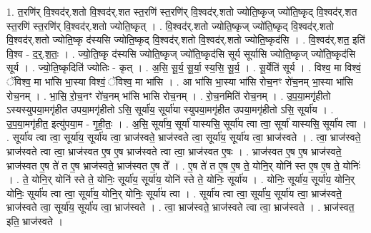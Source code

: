 \documentclass[17pt]{extarticle}
\begin{document}
1. त॒रणि॑र् वि॒श्वद॑र्.शतो वि॒श्वद॑र्.शत स्त॒रणि॑ स्त॒रणि॑र् वि॒श्वद॑र्.शतो ज्योति॒ष्कृज् ज्यो॑ति॒ष्कृद् वि॒श्वद॑र्.शत स्त॒रणि॑ स्त॒रणि॑र् वि॒श्वद॑र्.शतो ज्योति॒ष्कृत् । . वि॒श्वद॑र्.शतो ज्योति॒ष्कृज् ज्यो॑ति॒ष्कृद् वि॒श्वद॑र्.शतो वि॒श्वद॑र्.शतो ज्योति॒ष्कृ द॑स्यसि ज्योति॒ष्कृद् वि॒श्वद॑र्.शतो वि॒श्वद॑र्.शतो ज्योति॒ष्कृद॑सि । . वि॒श्वद॑र्.शत॒ इति॑ वि॒श्व - द॒र्॒.श॒तः॒ । . ज्यो॒ति॒ष्कृ द॑स्यसि ज्योति॒ष्कृज् ज्यो॑ति॒ष्कृद॑सि सूर्य सूर्यासि ज्योति॒ष्कृज् ज्यो॑ति॒ष्कृद॑सि सूर्य । . ज्यो॒ति॒ष्कृदिति॑ ज्योतिः - कृत् । . अ॒सि॒ सू॒र्य॒ सू॒र्या॒ स्य॒सि॒ सू॒र्य॒ । . सू॒र्येति॑ सूर्य । . विश्व॒ मा विश्वं॒ ॅविश्व॒ मा भा॑सि भा॒स्या विश्वं॒ ॅविश्व॒ मा भा॑सि । . आ भा॑सि भा॒स्या भा॑सि रोच॒नꣳ रो॑च॒नम् भा॒स्या भा॑सि रोच॒नम् । . भा॒सि॒ रो॒च॒नꣳ रो॑च॒नम् भा॑सि भासि रोच॒नम् । . रो॒च॒नमिति॑ रोच॒नम् । . उ॒प॒या॒मगृ॑हीतो ऽस्यस्युपया॒मगृ॑हीत उपया॒मगृ॑हीतो ऽसि॒ सूर्या॑य॒ सूर्या॑या स्युपया॒मगृ॑हीत उपया॒मगृ॑हीतो ऽसि॒ सूर्या॑य । . उ॒प॒या॒मगृ॑हीत॒ इत्यु॑पया॒म - गृ॒ही॒तः॒ । . अ॒सि॒ सूर्या॑य॒ सूर्या॑ यास्यसि॒ सूर्या॑य त्वा त्वा॒ सूर्या॑ यास्यसि॒ सूर्या॑य त्वा । . सूर्या॑य त्वा त्वा॒ सूर्या॑य॒ सूर्या॑य त्वा॒ भ्राज॑स्वते॒ भ्राज॑स्वते त्वा॒ सूर्या॑य॒ सूर्या॑य त्वा॒ भ्राज॑स्वते । . त्वा॒ भ्राज॑स्वते॒ भ्राज॑स्वते त्वा त्वा॒ भ्राज॑स्वत ए॒ष ए॒ष भ्राज॑स्वते त्वा त्वा॒ भ्राज॑स्वत ए॒षः । . भ्राज॑स्वत ए॒ष ए॒ष भ्राज॑स्वते॒ भ्राज॑स्वत ए॒ष ते॑ त ए॒ष भ्राज॑स्वते॒ भ्राज॑स्वत ए॒ष ते᳚ । . ए॒ष ते॑ त ए॒ष ए॒ष ते॒ योनि॒र् योनि॑ स्त ए॒ष ए॒ष ते॒ योनिः॑ । . ते॒ योनि॒र् योनि॑ स्ते ते॒ योनिः॒ सूर्या॑य॒ सूर्या॑य॒ योनि॑ स्ते ते॒ योनिः॒ सूर्या॑य । . योनिः॒ सूर्या॑य॒ सूर्या॑य॒ योनि॒र् योनिः॒ सूर्या॑य त्वा त्वा॒ सूर्या॑य॒ योनि॒र् योनिः॒ सूर्या॑य त्वा । . सूर्या॑य त्वा त्वा॒ सूर्या॑य॒ सूर्या॑य त्वा॒ भ्राज॑स्वते॒ भ्राज॑स्वते त्वा॒ सूर्या॑य॒ सूर्या॑य त्वा॒ भ्राज॑स्वते । . त्वा॒ भ्राज॑स्वते॒ भ्राज॑स्वते त्वा त्वा॒ भ्राज॑स्वते । . भ्राज॑स्वत॒ इति॒ भ्राज॑स्वते । \newline
\pagebreak
{}
\end{document}
